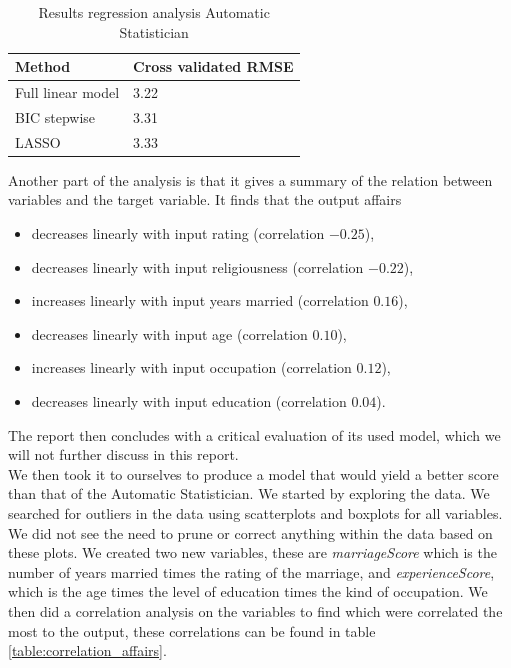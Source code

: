 \documentclass[a4paper, 10pt, conference]{ieeeconf}
\begin{document}
\begin{table}[!h]
\centering
\begin{tabular}{| l | l |}
  \hline
  Method & Cross validated RMSE \\
  \hline
  Full linear model & 3.22 \\
  BIC stepwise & 3.31 \\
  LASSO & 3.33 \\
  \hline
\end{tabular}
\caption{Results regression analysis Automatic Statistician}
\label{table:as_affairs}
\end{table}

Another part of the analysis is that it gives a summary of the relation between variables and the target variable. It finds that the output affairs

\begin{itemize}
    \item decreases linearly with input rating (correlation $-0.25$),
    \item decreases linearly with input religiousness (correlation $-0.22$),
    \item increases linearly with input years married (correlation $0.16$),
    \item decreases linearly with input age (correlation $0.10$),
    \item increases linearly with input occupation (correlation $0.12$),
    \item decreases linearly with input education (correlation $0.04$).
\end{itemize}

The report then concludes with a critical evaluation of its used model, which we will not further discuss in this report.\\

We then took it to ourselves to produce a model that would yield a better score than that of the Automatic Statistician. We started by exploring the data. We searched for outliers in the data using scatterplots and boxplots for all variables. We did not see the need to prune or correct anything within the data based on these plots. We created two new variables, these are \textit{marriageScore} which is the number of years married times the rating of the marriage, and \textit{experienceScore}, which is the age times the level of education times the kind of occupation. We then did a correlation analysis on the variables to find which were correlated the most to the output, these correlations can be found in table \ref{table:correlation_affairs}.
\end{document}
